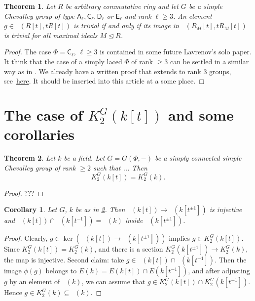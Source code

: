 \documentclass[oneside,12pt]{amsart}
\newtheorem{thm}{Theorem}
\numberwithin{equation}{section}
\numberwithin{lem}{section}
\newtheorem{cor}[lem]{Corollary}
\theoremstyle{definition}
\theoremstyle{remark}
\DeclareMathOperator{\St}{St^G}
\newcommand{\rA}{\mathsf{A}}
\newcommand{\rC}{\mathsf{C}}
\newcommand{\rD}{\mathsf{D}}
\newcommand{\rE}{\mathsf{E}}
\begin{document}
\begin{thm}\label{thm:lg-k2}
Let $R$ be arbitrary commutative ring and let $G$ be a simple Chevalley group of type $\rA_\ell, \rC_\ell, \rD_\ell$ or $\rE_\ell$ and rank $\ell \geq 3$. 
An element $g \in \St(R[t], tR[t])$ is trivial if and only if 
its image in $\St(R_M[t], tR_M[t])$ is trivial for all maximal ideals $M \trianglelefteq R$.
\end{thm}
\begin{proof}
The case $\Phi=\rC_\ell$, $\ell\geq 3$ is contained in some future Lavrenov's solo paper.
It think that the case of a simply laced $\Phi$ of rank $\geq 3$ can be settled in a similar way as in \cite{S15}.
We already have a written proof that \cite[Lemma~2.3]{Tu} extends to rank $3$ groups, see~\href{https://github.com/sxhya/LGK2Chevalley/blob/master/paper.tex}{here}.
It should be inserted into this article at a some place.
\end{proof}

\section{The case of $K_2^G(k[t])$ and some corollaries}

\begin{thm}\label{thm:k[t]}
Let $k$ be a field.
Let $G=G(\Phi,-)$ be a simply connected simple Chevalley group of rank $\ge 2$ such that ...
Then $$K_2^G(k[t])=K_2^G(k).$$
\end{thm}
\begin{proof}
???
\end{proof}

\begin{cor}\label{cor:k[t]inj}
Let $G$, $k$ be as in \cref{thm:k[t]}. Then $\St(k[t])\to\St(k[t^{\pm 1}])$ is injective and $\St(k[t])\cap\St(k[t^{-1}])=\St(k)$ inside
$\St(k[t^{\pm 1}])$.
\end{cor}
\begin{proof}
Clearly, $g\in\ker(\St(k[t])\to\St(k[t^{\pm 1}]))$ implies $g\in K_2^G(k[t])$. Since $K_2^G(k[t])=K_2^G(k)$,
and  there is a section $K_2^G(k[t^{\pm 1}])\to K_2^G(k)$, the map is injective.
Second claim: take $g\in \St(k[t])\cap\St(k[t^{-1}])$.
Then the image $\phi(g)$ belongs to $E(k)=E(k[t])\cap E(k[t^{-1}])$, and
after adjusting $g$ by an element of $\St(k)$, we can assume that $g\in K_2^G(k[t])\cap K_2^G(k[t^{-1}])$. Hence
$g\in K_2^G(k)\subseteq\St(k)$.
\end{proof}
\end{document}
